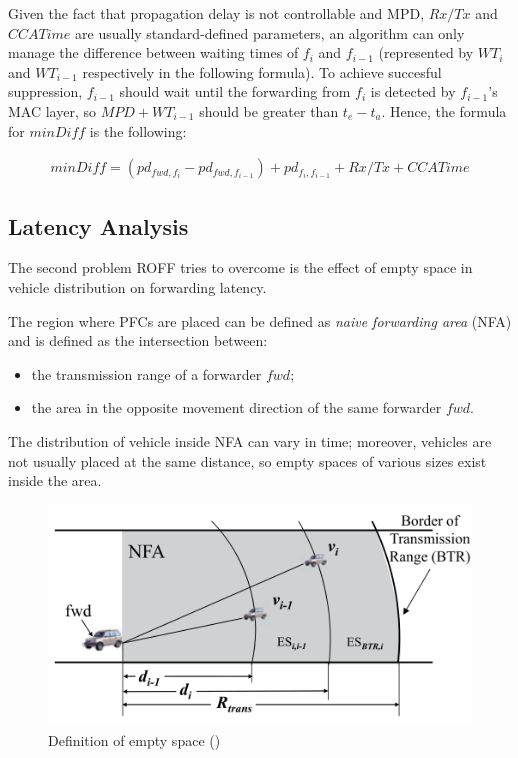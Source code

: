 			
			Given the fact that propagation delay is not controllable and MPD, $Rx/Tx$ and $CCATime$ are usually standard-defined parameters, an algorithm can only manage the difference between waiting times of $f_i$ and $f_{i-1}$ (represented by $WT_i$ and $WT_{i-1}$ respectively in the following formula).
			To achieve succesful suppression, $f_{i-1}$ should wait until the forwarding from $f_i$ is detected by $f_{i-1}$'s MAC layer, so $MPD+WT_{i-1}$ should be greater than $t_e - t_a$. Hence, the formula for $minDiff$ is the following:
			
			\begin{gather}
				\label{eq:minDiff}
				minDiff = (pd_{fwd, f_i} - pd_{fwd, f_{i-1}}) + pd_{f_i, f_{i-1}} + Rx/Tx + CCATime 
			\end{gather}
		
		\subsection{Latency Analysis}
			\label{ssec:latency-analysis}
			The second problem ROFF tries to overcome is the effect of empty space in vehicle distribution on forwarding latency.
			
			The region where PFCs are placed can be defined as \textit{naive forwarding area} (NFA) and is defined as the intersection between:
			\begin{itemize}
				\item the transmission range of a forwarder $fwd$;
				\item the area in the opposite movement direction of the same forwarder $fwd$.
			\end{itemize}
			The distribution of vehicle inside NFA can vary in time; moreover, vehicles are not usually placed at the same distance, so empty spaces of various sizes exist inside the area.
			
			\begin{figure}[H]
				\centering
				\includegraphics[width=\textwidth]{immagini/emptySpace}
				\caption{Definition of empty space (\cite{6906275})}
				\label{fig:emptySpace}
			\end{figure}
			
